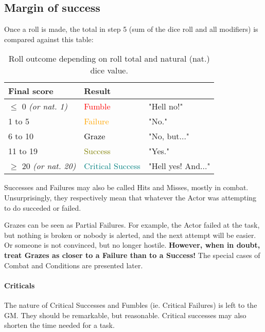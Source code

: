 \subsection{Margin of success}

Once a roll is made, the total in step 5 (sum of the dice roll and all modifiers) is compared against this table:

\begin{table}[h!tbp]
	\begin{center}
		\begin{tabular}{p{2.5cm}p{2.4cm}p{2.6cm}} \toprule
			
			\textbf{Final score} & \textbf{Result} \\ \midrule
			$\leq$ 0 \textit{(or nat. 1)} & \textcolor{red}{Fumble} & "Hell no!" \\
			1 to 5 & \textcolor{orange}{Failure} & "No." \\
			6 to 10 & \textcolor{black}{Graze} & "No, but..." \\
			11 to 19 & \textcolor{olive}{Success} & "Yes." \\
			$\geq$ 20 \textit{(or nat. 20)} & \textcolor{teal}{Critical Success} & "Hell yes! And..." \\
			\bottomrule
		\end{tabular}
	\end{center}
	\caption{Roll outcome depending on roll total and natural (nat.) dice value.}
	\label{success_roll}
\end{table}

Successes and Failures may also be called Hits and Misses, mostly in combat. Unsurprisingly, they respectively mean that whatever the Actor was attempting to do succeded or failed.

Grazes can be seen as Partial Failures. For example, the Actor failed at the task, but nothing is broken or nobody is alerted, and the next attempt will be easier. Or someone is not convinced, but no longer hostile. \textbf{However, when in doubt, treat Grazes as closer to a Failure than to a Success!} The special cases of Combat and Conditions are presented later.

\paragraph{Criticals} 

The nature of Critical Successes and Fumbles (ie. Critical Failures) is left to the GM. They should be remarkable, but reasonable. Critical successes may also shorten the time needed for a task.

